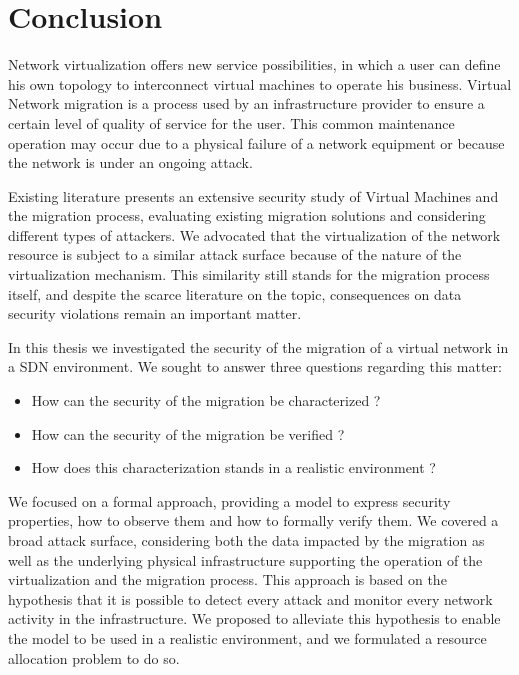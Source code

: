 \section{Conclusion}
Network virtualization offers new service possibilities, in which a user can define his own topology to interconnect virtual machines to operate his business.
Virtual Network migration is a process used by an infrastructure provider to ensure a certain level of quality of service for the user.
This common maintenance operation may occur due to a physical failure of a network equipment or because the network is under an ongoing attack.

Existing literature presents an extensive security study of Virtual Machines and the migration process, evaluating existing migration solutions and considering different types of attackers. We advocated that the virtualization of the network resource is subject to a similar attack surface because of the nature of the virtualization mechanism. This similarity still stands for the migration process itself, and despite the scarce literature on the topic, consequences on data security violations remain an important matter.

In this thesis we investigated the security of the migration of a virtual network in a SDN environment. 
We sought to answer three questions regarding this matter:

\begin{itemize}
    \item How can the security of the migration be characterized ?
    \item How can the security of the migration be verified ?
    \item How does this characterization stands in a realistic environment ?
\end{itemize}

We focused on a formal approach, providing a model to express security properties, how to observe them and how to formally verify them. 
We covered a broad attack surface, considering both the data impacted by the migration as well as the underlying physical infrastructure supporting the operation of the virtualization and the migration process. 
This approach is based on the hypothesis that it is possible to detect every attack and monitor every network activity in the infrastructure. 
We proposed to alleviate this hypothesis to enable the model to be used in a realistic environment, and we formulated a resource allocation problem to do so.

